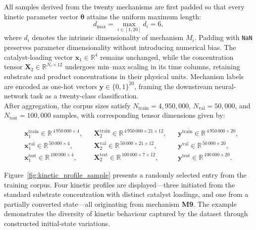 \documentclass{dissertation}
\begin{document}
All samples derived from the twenty mechanisms are first padded so that every kinetic parameter vector \( \boldsymbol{\theta} \) attains the uniform maximum length:
\begin{equation}
d_{\max} = \max_{i \in [1,20]} d_i = 6,
\end{equation}
where \( d_i \) denotes the intrinsic dimensionality of mechanism \( M_i \). Padding with \texttt{NaN} preserves parameter dimensionality without introducing numerical bias. The catalyst-loading vector \( \mathbf{x}_1 \in \mathbb{R}^{4} \) remains unchanged, while the concentration tensor \( \mathbf{X}_2 \in \mathbb{R}^{N_t \times 12} \) undergoes min–max scaling in its time columns, retaining substrate and product concentrations in their physical units. Mechanism labels are encoded as one-hot vectors \( \mathbf{y} \in \{0,1\}^{20} \), framing the downstream neural-network task as a twenty-class classification.\\

After aggregation, the corpus sizes satisfy  \( N_{\text{train}} = 4{,}950{,}000 \), \( N_{\text{val}} = 50{,}000 \), and \( N_{\text{test}} = 100{,}000 \) samples, with corresponding tensor dimensions given by:

\[
\begin{aligned}
&\mathbf{x}_1^{\text{train}} \in \mathbb{R}^{\,4\,950\,000\times 4}, &
&\mathbf{X}_2^{\text{train}} \in \mathbb{R}^{\,4\,950\,000\times 21\times 12}, &
&\mathbf{y}^{\text{train}} \in \mathbb{R}^{\,4\,950\,000\times 20}, \\[0.5em]
&\mathbf{x}_1^{\text{val}} \in \mathbb{R}^{\,50\,000\times 4}, &
&\mathbf{X}_2^{\text{val}} \in \mathbb{R}^{\,50\,000\times 21\times 12}, &
&\mathbf{y}^{\text{val}} \in \mathbb{R}^{\,50\,000\times 20}, \\[0.5em]
&\mathbf{x}_1^{\text{test}} \in \mathbb{R}^{\,100\,000\times 4}, &
&\mathbf{X}_2^{\text{test}} \in \mathbb{R}^{\,100\,000\times 7\times 12}, &
&\mathbf{y}^{\text{test}} \in \mathbb{R}^{\,100\,000\times 20}.
\end{aligned}
\]

\vspace{0.2cm}
Figure~\ref{fig:kinetic_profile_sample} presents a randomly selected entry from the training corpus. Four kinetic profiles are displayed—three initiated from the standard substrate concentration with distinct catalyst loadings, and one from a partially converted state—all originating from mechanism \textbf{M9}. The example demonstrates the diversity of kinetic behaviour captured by the dataset through constructed initial-state variations.
\end{document}
